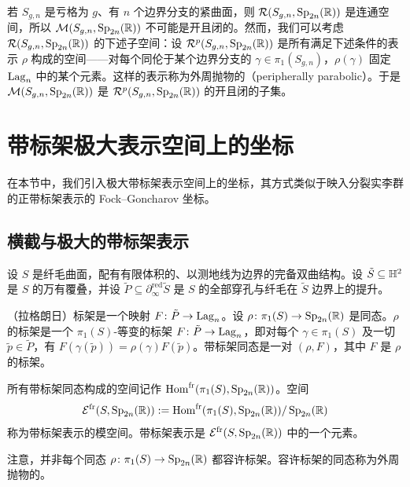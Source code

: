 \begin{remark}[11.20]
若 $S_{g,n}$ 是亏格为 $g$、有 $n$ 个边界分支的紧曲面，则 $\mathcal{R}(S_{g,n},\operatorname{Sp}_{2n}(\mathbb{R}))$ 是连通空间，所以 $\mathcal{M}(S_{g,n},\operatorname{Sp}_{2n}(\mathbb{R}))$ 不可能是开且闭的。然而，我们可以考虑 $\mathcal{R}(S_{g,n},\operatorname{Sp}_{2n}(\mathbb{R}))$ 的下述子空间：设 $\mathcal{R}^{p}(S_{g,n},\operatorname{Sp}_{2n}(\mathbb{R}))$ 是所有满足下述条件的表示 $\rho$ 构成的空间——对每个同伦于某个边界分支的 $\gamma\in\pi_1(S_{g,n})$，$\rho(\gamma)$ 固定 $\operatorname{Lag}_n$ 中的某个元素。这样的表示称为外周抛物的（peripherally parabolic）。于是 $\mathcal{M}(S_{g,n},\operatorname{Sp}_{2n}(\mathbb{R}))$ 是 $\mathcal{R}^{p}(S_{g,n},\operatorname{Sp}_{2n}(\mathbb{R}))$ 的开且闭的子集。
\end{remark}


\section{带标架极大表示空间上的坐标}

在本节中，我们引入极大带标架表示空间上的坐标，其方式类似于映入分裂实李群的正带标架表示的 Fock--Goncharov 坐标。

\subsection{横截与极大的带标架表示}

设 $S$ 是纤毛曲面，配有有限体积的、以测地线为边界的完备双曲结构。设 $\tilde S\subseteq\mathbb{H}^{2}$ 是 $S$ 的万有覆叠，并设 $\tilde P\subseteq\partial_\infty^{\mathrm{red}}\tilde S$ 是 $S$ 的全部穿孔与纤毛在 $\tilde S$ 边界上的提升。

\begin{definition}[11.21]
（拉格朗日）标架是一个映射 $F\colon\tilde P\to\operatorname{Lag}_n$。设 $\rho\colon\pi_1(S)\to\operatorname{Sp}_{2n}(\mathbb{R})$ 是同态。$\rho$ 的标架是一个 $\pi_1(S)$-等变的标架 $F\colon\tilde P\to\operatorname{Lag}_n$，即对每个 $\gamma\in\pi_1(S)$ 及一切 $\tilde p\in\tilde P$，有 $F(\gamma(\tilde p))=\rho(\gamma)F(\tilde p)$。带标架同态是一对 $(\rho,F)$，其中 $F$ 是 $\rho$ 的标架。
\end{definition}

所有带标架同态构成的空间记作 $\operatorname{Hom}^{\mathrm{fr}}(\pi_1(S),\operatorname{Sp}_{2n}(\mathbb{R}))$。空间
\[
\mathcal{E}^{\mathrm{fr}}(S,\operatorname{Sp}_{2n}(\mathbb{R})):=\operatorname{Hom}^{\mathrm{fr}}(\pi_1(S),\operatorname{Sp}_{2n}(\mathbb{R}))/\operatorname{Sp}_{2n}(\mathbb{R})
\]
称为带标架表示的模空间。带标架表示是 $\mathcal{E}^{\mathrm{fr}}(S,\operatorname{Sp}_{2n}(\mathbb{R}))$ 中的一个元素。

\begin{remark}[11.22]
注意，并非每个同态 $\rho\colon\pi_1(S)\to\operatorname{Sp}_{2n}(\mathbb{R})$ 都容许标架。容许标架的同态称为外周抛物的。
\end{remark}

